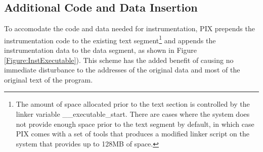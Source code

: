 \subsection{Additional Code and Data Insertion}

To accomodate the code and data needed for instrumentation, PIX prepends the instrumentation code to the existing text
segment\footnote{The amount of space allocated prior to the text section is
controlled by the linker variable \_\_executable\_start. There are cases
where the system does not provide enough space prior to the text segment by
default, in which case PIX comes with a set of tools that produces a modified linker
script on the system that provides up to 128MB of space.} and appends the instrumentation data to the
data segment, as shown in Figure \ref{Figure:InstExecutable}). This
scheme has the added benefit of causing no immediate disturbance to the
addresses of the original data and most of the original text of the program.

